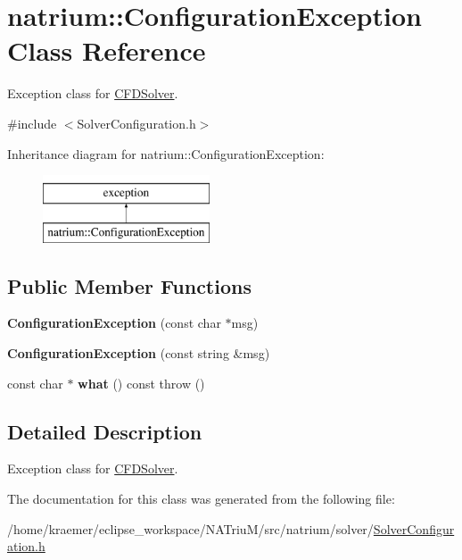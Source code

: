 \hypertarget{classnatrium_1_1ConfigurationException}{\section{natrium\-:\-:Configuration\-Exception Class Reference}
\label{classnatrium_1_1ConfigurationException}
}


Exception class for \hyperlink{classnatrium_1_1CFDSolver}{C\-F\-D\-Solver}.  




{\ttfamily \#include $<$Solver\-Configuration.\-h$>$}

Inheritance diagram for natrium\-:\-:Configuration\-Exception\-:\begin{figure}[H]
\begin{center}
\leavevmode
\includegraphics[height=2.000000cm]{classnatrium_1_1ConfigurationException}
\end{center}
\end{figure}
\subsection*{Public Member Functions}
\begin{DoxyCompactItemize}
\item 
\hypertarget{classnatrium_1_1ConfigurationException_ac9248a6224570c873784f201ef9ae34f}{{\bfseries Configuration\-Exception} (const char $\ast$msg)}\label{classnatrium_1_1ConfigurationException_ac9248a6224570c873784f201ef9ae34f}

\item 
\hypertarget{classnatrium_1_1ConfigurationException_a9f622f88d955e5c5e01719b7fcb273a6}{{\bfseries Configuration\-Exception} (const string \&msg)}\label{classnatrium_1_1ConfigurationException_a9f622f88d955e5c5e01719b7fcb273a6}

\item 
\hypertarget{classnatrium_1_1ConfigurationException_a48c72bd9bbae81e098a1f214899b3de6}{const char $\ast$ {\bfseries what} () const   throw ()}\label{classnatrium_1_1ConfigurationException_a48c72bd9bbae81e098a1f214899b3de6}

\end{DoxyCompactItemize}


\subsection{Detailed Description}
Exception class for \hyperlink{classnatrium_1_1CFDSolver}{C\-F\-D\-Solver}. 

The documentation for this class was generated from the following file\-:\begin{DoxyCompactItemize}
\item 
/home/kraemer/eclipse\-\_\-workspace/\-N\-A\-Triu\-M/src/natrium/solver/\hyperlink{SolverConfiguration_8h}{Solver\-Configuration.\-h}\end{DoxyCompactItemize}
